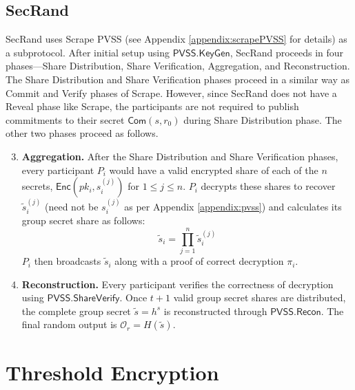 \documentclass[letterpaper,twocolumn,10pt]{article}
\theoremstyle{definition}
\theoremstyle{remark}
\begin{document}
\subsection{SecRand}
\label{appendix:secRand}
SecRand \cite{guo2020secRand} uses Scrape PVSS (see Appendix \ref{appendix:scrapePVSS} for details) as a subprotocol. After initial setup using $\mathsf{PVSS.KeyGen}$, SecRand proceeds in four phases---Share Distribution, Share Verification, Aggregation, and Reconstruction. The Share Distribution and Share Verification phases proceed in a similar way as Commit and Verify phases of Scrape. However, since SecRand does not have a Reveal phase like Scrape, the participants are not required to publish commitments to their secret $\mathsf{Com}(s, r_0)$ during Share Distribution phase. The other two phases proceed as follows.

\begin{enumerate}
    \setcounter{enumi}{2}
    \item \textbf{Aggregation.} After the Share Distribution and Share Verification phases, every participant $P_i$ would have a valid encrypted share of each of the $n$ secrets, $\mathsf{Enc}(pk_i, s_i^{(j)})$ for $1 \le j \le n$. $P_i$ decrypts these shares to recover $\tilde{s}_i^{(j)}$ (need not be $s_i^{(j)}$ as per Appendix \ref{appendix:pvss}) and calculates its group secret share as follows: 
    $$\tilde{s}_i = \prod_{j=1}^{n}\tilde{s}_i^{(j)}$$
    $P_i$ then broadcasts $\tilde{s}_i$ along with a proof of correct decryption $\pi_i$.
    \item \textbf{Reconstruction.} Every participant verifies the correctness of decryption using $\mathsf{PVSS.ShareVerify}$. Once $t + 1$ valid group secret shares are distributed, the complete group secret $\tilde{s} = h^s$ is reconstructed through $\mathsf{PVSS.Recon}$. The final random output is $\mathcal{O}_r = H(\tilde{s})$.
\end{enumerate}
\fi
\iffalse
\section{Threshold Encryption}
\label{appendix:thresholdEnc}
\end{document}
